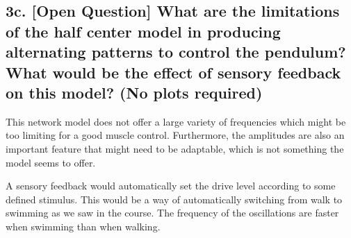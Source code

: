 \documentclass{cmc}
\begin{document}
\subsection*{3c. [Open Question] What are the limitations of the half
  center model in producing alternating patterns to control the
  pendulum? What would be the effect of sensory feedback on this
  model? (No plots required)}
\label{sec:4d}
This network model does not offer a large variety of frequencies which might be too limiting for a good muscle control. Furthermore, the amplitudes are also an important feature that might need to be adaptable, which is not something the model seems to offer. 

A sensory feedback would automatically set the drive level according to some defined stimulus. This would be a way of automatically switching from walk to swimming as we saw in the course. The frequency of the oscillations are faster when swimming than when walking. 
\end{document}
